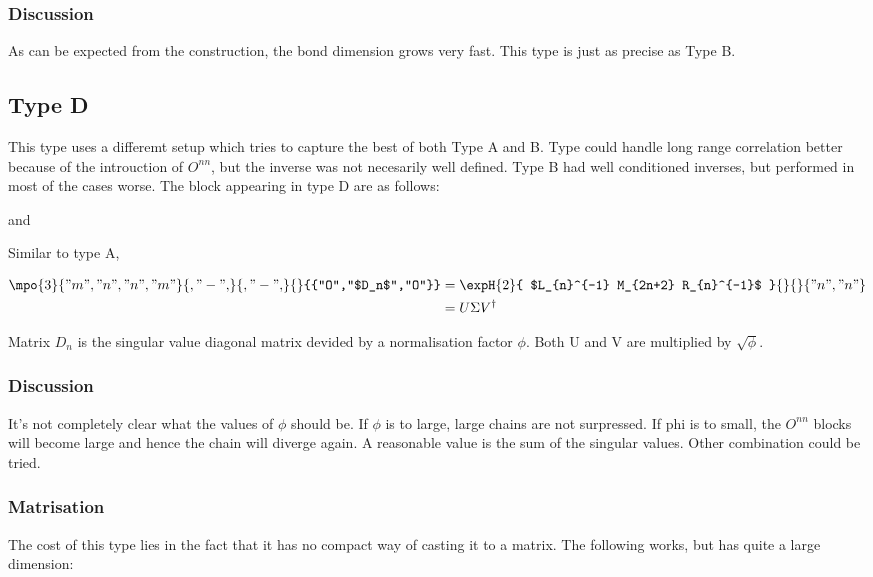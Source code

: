 \subsubsection{Discussion}
As can be expected from the construction, the bond dimension grows very fast. This type is just as precise as Type B.

\subsection{Type D}

This type uses a differemt setup which tries to capture the best of both Type A and B. Type  could handle long range correlation better because of the introuction of $O^{n n}$, but the inverse was not necesarily well defined. Type B had well conditioned inverses, but performed in most of the cases worse. The block appearing in type D are as follows:

 and 

Similar to type A,

\def \rhs{\expH{2}{ $L_{n}^{-1}  M_{2n+2}  R_{n}^{-1}$ }{}{}{{"n","n"}}  }
\begin{equation}
    \begin{split}
        \mpo{3}{{"m","n","n","m"}}{{,"-",}}{{,"-",}}{}{{"O","$D_n$","O"}} &= \rhs \\
        &= U \Sigma V^{ \dagger}
    \end{split}
    \label{eq_nmn_level}
\end{equation}

Matrix $D_n$ is the singular value diagonal matrix devided by a normalisation factor $\phi$. Both U and V are multiplied by $  \sqrt{\phi} $.

\subsubsection{Discussion}
It's not completely clear what the values of $\phi$ should be.  If $\phi$ is to large, large chains are not surpressed. If phi is to small, the $O^{n n}$ blocks will become large and hence the chain will diverge again. A reasonable value is the sum of the singular values. Other combination could be tried.

\subsubsection{Matrisation}
The cost of this type lies in the fact that it has no compact way of casting it to a matrix. The following works, but has quite a large dimension:

